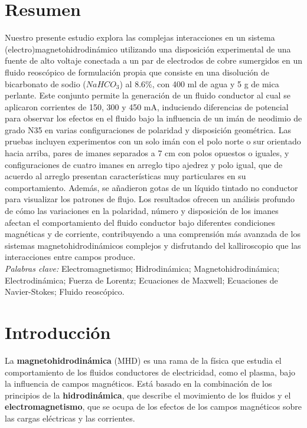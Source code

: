 \documentclass[article,12pt]{elsarticle}
\begin{document}
\section*{Resumen}
Nuestro presente estudio explora las complejas interacciones en un sistema (electro)magnetohidrodinámico utilizando una disposición experimental de una fuente de alto voltaje conectada a un par de electrodos de cobre sumergidos en un fluido reoscópico de formulación propia que consiste en una disolución de bicarbonato de sodio ($NaHCO_3$) al 8.6\%, con 400 ml de agua y 5 g de mica perlante. Este conjunto permite la generación de un fluido conductor al cual se aplicaron corrientes de 150, 300 y 450 mA, induciendo diferencias de potencial para observar los efectos en el fluido bajo la influencia de un imán de neodimio de grado N35 en varias configuraciones de polaridad y disposición geométrica. Las pruebas incluyen experimentos con un solo imán con el polo norte o sur orientado hacia arriba, pares de imanes separados a 7 cm con polos opuestos o iguales, y configuraciones de cuatro imanes en arreglo tipo ajedrez y polo igual, que de acuerdo al arreglo presentan características muy particulares en su comportamiento. Además, se añadieron gotas de un líquido tintado no conductor para visualizar los patrones de flujo. Los resultados ofrecen un análisis profundo de cómo las variaciones en la polaridad, número y disposición de los imanes afectan el comportamiento del fluido conductor bajo diferentes condiciones magnéticas y de corriente, contribuyendo a una comprensión más avanzada de los sistemas magnetohidrodinámicos complejos y disfrutando del kalliroscopio que las interacciones entre campos produce.\\

\textit{Palabras clave:} Electromagnetismo; Hidrodinámica; Magnetohidrodinámica; Electrodinámica; Fuerza de Lorentz; Ecuaciones de Maxwell; Ecuaciones de Navier-Stokes; Fluido reoscópico. \\
\hline

\section{Introducción}
    La \textbf{magnetohidrodinámica} (MHD) es una rama de la física que estudia el comportamiento de los fluidos conductores de electricidad, como el plasma, bajo la influencia de campos magnéticos. Está basado en la combinación de los principios de la \textbf{hidrodinámica}, que describe el movimiento de los fluidos y el \textbf{electromagnetismo}, que se ocupa de los efectos de los campos magnéticos sobre las cargas eléctricas y las corrientes.
    
\end{document}
